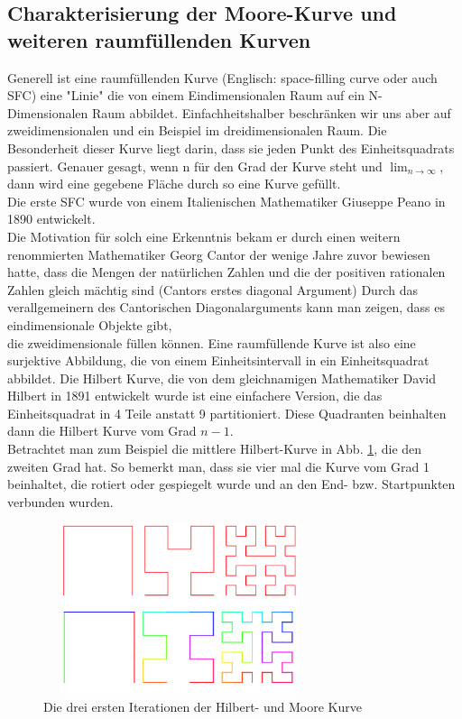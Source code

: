 \documentclass[course=erap]{aspdoc}
\begin{document}
\subsection{Charakterisierung der Moore-Kurve und weiteren raumfüllenden Kurven}
Generell ist eine raumfüllenden Kurve (Englisch: space-filling curve oder auch SFC) eine "Linie" die von einem Eindimensionalen Raum auf ein N-Dimensionalen Raum abbildet. Einfachheitshalber beschränken wir uns aber auf zweidimensionalen und ein Beispiel im dreidimensionalen Raum. Die Besonderheit dieser Kurve liegt darin, dass sie jeden Punkt des Einheitsquadrats passiert. Genauer gesagt, wenn n für den Grad der Kurve steht und $\lim_{n\to\infty}$, dann wird eine gegebene Fläche durch so eine Kurve gefüllt.\\
Die erste SFC wurde von einem Italienischen Mathematiker Giuseppe Peano in 1890 entwickelt.
\\
Die Motivation für solch eine Erkenntnis bekam er durch einen weitern  renommierten Mathematiker Georg Cantor der wenige Jahre zuvor bewiesen hatte, dass die Mengen der natürlichen Zahlen und die der positiven rationalen Zahlen gleich mächtig sind (Cantors erstes diagonal Argument)%
Durch das verallgemeinern des Cantorischen Diagonalarguments kann man zeigen, dass es eindimensionale Objekte gibt, \\ die zweidimensionale füllen können. Eine raumfüllende Kurve ist also eine surjektive Abbildung, die von einem Einheitsintervall in ein Einheitsquadrat abbildet.
Die Hilbert Kurve, die von dem gleichnamigen Mathematiker David Hilbert in 1891 entwickelt wurde ist eine einfachere Version, die das Einheitsquadrat in 4 Teile anstatt 9 partitioniert. Diese Quadranten beinhalten dann die Hilbert Kurve vom Grad $n - 1$. \\Betrachtet man zum Beispiel die mittlere Hilbert-Kurve in Abb. \ref{fig:mooreCurve}, die den zweiten Grad hat. So bemerkt man, dass sie vier mal die Kurve vom Grad 1 beinhaltet, die rotiert oder gespiegelt wurde und an den End- bzw. Startpunkten verbunden wurden.
\begin{figure}[h]
\centering
    \includegraphics[width=8cm, height=5cm]{Moore_and_Hilbert}
    \caption{Die drei ersten Iterationen der Hilbert- und Moore Kurve}
    \label{fig:mooreCurve}
\end{figure}
\end{document}
